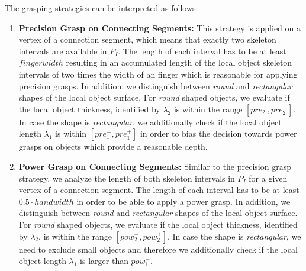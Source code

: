 The grasping strategies can be interpreted as follows:
\begin{enumerate}
\item \textbf{Precision Grasp on Connecting Segments:}
This strategy is applied on a vertex of a connection segment, which means that exactly two skeleton intervals are available in $P_I$. 
The length of each interval has to be at least $fingerwidth$ resulting in an 
accumulated length of the local object skeleton intervals of two times the width of an finger which is reasonable for applying precision grasps. In addition, we distinguish between \textit{round} and \textit{rectangular} shapes of the local object surface.
For \textit{round} shaped objects, we evaluate if the local object thickness, identified by $\lambda_2$ is within the range $[pre_2^-,pre_2^+]$. In case the shape is \textit{rectangular}, we additionally check if the local object length $\lambda_1$ is within $[pre_1^-, pre_1^+]$ in order to bias the decision towards power grasps on objects which provide a reasonable depth. %

\item \textbf{Power Grasp on Connecting Segments:}
Similar to the precision grasp strategy, we analyze the length of both skeleton intervals in $P_I$ for a given vertex of a connection segment.
The length of each interval has to be at least $0.5 \cdot handwidth$ in order to be able to apply a power grasp.
In addition, we distinguish between \textit{round} and \textit{rectangular} shapes of the local object surface.
For \textit{round} shaped objects, we evaluate if the local object thickness, identified by $\lambda_2$, is within the range $[pow_2^-,pow_2^+]$. In case the shape is \textit{rectangular}, we need to exclude small objects and therefore we additionally check if the local object length $\lambda_1$ is larger than $pow_1^-$.
%


\end{enumerate}
